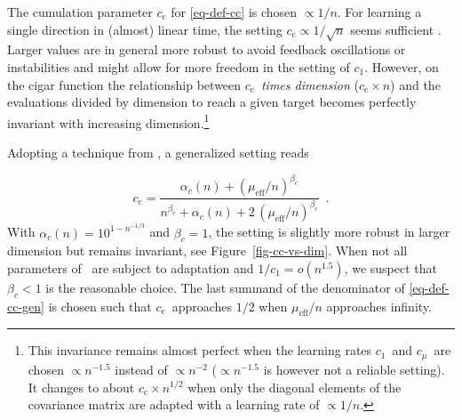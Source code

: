 \documentclass{article} %
\newcommand{\N}{\ensuremath{n}}
\newcommand{\mueff}{\ensuremath{\mu_\mathrm{eff}}}
\newcommand{\cc}{\ensuremath{c_\mathrm{c}}}
\newcommand{\cone}{\ensuremath{c_1}}
\newcommand{\cmu}{\ensuremath{c_\mu}}
\begin{document}
\begin{appendix}
The cumulation parameter $\cc$ for \eqref{eq-def-cc} is chosen $\propto 1/\N$. 
For learning a single direction in (almost) linear time, the setting $\cc \propto 1/\sqrt{\N}$ seems sufficient \cite{hansen2014principled}. 
Larger values are in general more robust to avoid feedback oscillations or instabilities and might allow for more freedom in the setting of \cone.
However, on the cigar function the relationship between \cc\ \emph{times dimension} ($\cc\times\N$) and the evaluations divided by dimension to reach a given target becomes perfectly invariant with increasing dimension.\footnote{
This invariance remains almost perfect when the learning rates \cone\ and \cmu\ are chosen $\propto\N^{-1.5}$ instead of $\propto\N^{-2}$ ($\propto\N^{-1.5}$ is however not a reliable setting). 
It changes to about $\cc\times\N^{1/2}$ when only the diagonal elements of the covariance matrix are adapted with a learning rate of $\propto1/\N$. }

Adopting a technique from \cite[Eq.\ (11)]{suttorp2009ecm}, a generalized setting reads

\begin{equation}\label{eq-def-cc-gen}
\cc = \frac{\alpha_c(\N) + (\mueff/\N)^{\beta_c}}{\N^{\beta_c} + \alpha_c(\N) + 2\,(\mueff/\N)^{\beta_c}} \enspace.
\end{equation}
%
With $\alpha_c(\N)=10^{1-\N^{-1/3}}$ and $\beta_c=1$, the setting is slightly more robust in larger dimension but remains invariant, see Figure~\ref{fig-cc-vs-dim}.
When not all parameters of \C\ are subject to adaptation and $1/\cone = o(\N^{1.5})$, we suspect that $\beta_c < 1$ is the reasonable choice.
The last summand of the denominator of \eqref{eq-def-cc-gen} is chosen such that \cc\ approaches $1/2$ when 
$\mueff/\N$ approaches infinity. 


\end{appendix}
\end{document}
